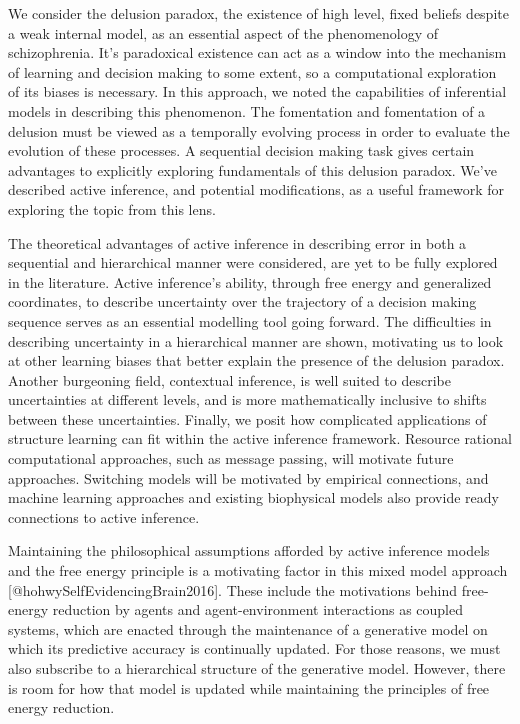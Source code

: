 \documentclass{article}
\begin{document}
We consider the delusion paradox, the existence of high level, fixed beliefs despite a weak internal model, as an essential aspect of the phenomenology of schizophrenia. It's paradoxical existence can act as a window into the mechanism of learning and decision making to some extent, so a computational exploration of its biases is necessary. In this approach, we noted the capabilities of inferential models in describing this phenomenon. The fomentation and fomentation of a delusion must be viewed as a temporally evolving process in order to evaluate the evolution of these processes. A sequential decision making task gives certain advantages to explicitly exploring fundamentals of this delusion paradox. We've described active inference, and potential modifications, as a useful framework for exploring the topic from this lens.

The theoretical advantages of active inference in describing error in both a sequential and hierarchical manner were considered, are yet to be fully explored in the literature. Active inference's ability, through free energy and generalized coordinates, to describe uncertainty over the trajectory of a decision making sequence serves as an essential modelling tool going forward. The difficulties in describing uncertainty in a hierarchical manner are shown, motivating us to look at other learning biases that better explain the presence of the delusion paradox. Another burgeoning field, contextual inference, is well suited to describe uncertainties at different levels, and is more mathematically inclusive to shifts between these uncertainties. Finally, we posit how complicated applications of structure learning can fit within the active inference framework. Resource rational computational approaches, such as message passing, will motivate future approaches. Switching models will be motivated by empirical connections, and machine learning approaches and existing biophysical models also provide ready connections to active inference.

Maintaining the philosophical assumptions afforded by active inference models and the free energy principle is a motivating factor in this mixed model approach [@hohwySelfEvidencingBrain2016]. These include the motivations behind free-energy reduction by agents and agent-environment interactions as coupled systems, which are enacted through the maintenance of a generative model on which its predictive accuracy is continually updated. For those reasons, we must also subscribe to a hierarchical structure of the generative model. However, there is room for how that model is updated while maintaining the principles of free energy reduction.



  
\end{document}
